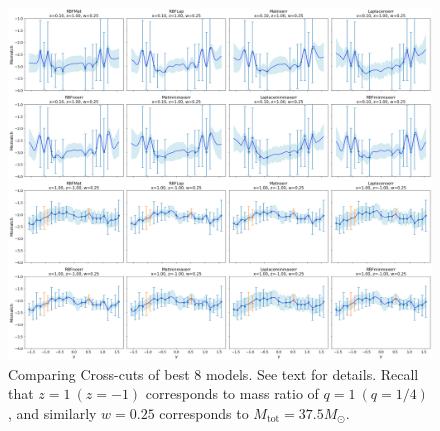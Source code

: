 \documentclass{ucdgradtaughtthesis}
\begin{document}
\begin{figure}[H]
    \centering
    \includegraphics[width=1\textwidth]{LatexPlots/final_gps_plots/gps_crosscuts_bestmodels.png}
    \caption[Comparing Cross-cuts of best 8 models.]{Comparing Cross-cuts of best 8 models. See text for details. Recall that $z=1\ (z=-1)$ corresponds
    to mass ratio of $q=1\ (q=1/4)$, and similarly $w=0.25$ corresponds to $M_\text{tot}=37.5M_\odot$.}
    \label{fig:crosscuts_bestmodels}
\end{figure}
\end{document}
